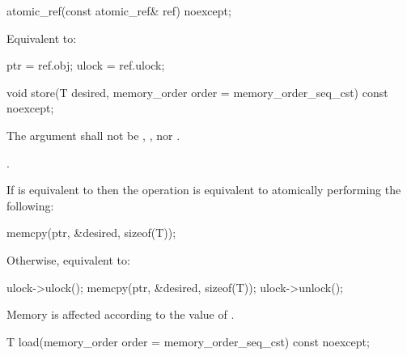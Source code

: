 \begin{itemdecl}
atomic_ref(const atomic_ref& ref) noexcept;
\end{itemdecl}

\begin{itemdescr}
\pnum
\effects {}
\begin{addedblock}Equivalent to:
\begin{codeblock}
  ptr = ref.obj;
  ulock = ref.ulock;
\end{codeblock}
\end{addedblock}

\end{itemdescr}


\begin{itemdecl}
void store(T desired, memory_order order = memory_order_seq_cst) const noexcept;
\end{itemdecl}

\begin{itemdescr}
\pnum
\removed{\requires}\added{\expects} The  argument shall not be
,
, nor
.

\pnum
{}.
\begin{addedblock}
\effects If  is equivalent to 
then the operation is equivalent to atomically performing the following:
\begin{codeblock}
  memcpy(ptr, &desired, sizeof(T));
\end{codeblock}
Otherwise, equivalent to:
\begin{codeblock}
  ulock->ulock();
  memcpy(ptr, &desired, sizeof(T));
  ulock->unlock();
\end{codeblock}
\end{addedblock}
Memory is affected according to the value of .
\end{itemdescr}

\begin{itemdecl}
T load(memory_order order = memory_order_seq_cst) const noexcept;
\end{itemdecl}

